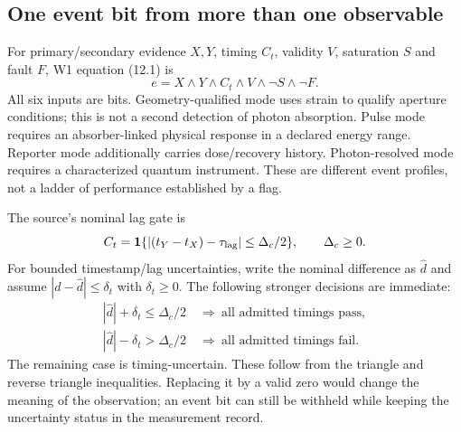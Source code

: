 \subsection{One event bit from more than one observable}
For primary/secondary evidence $X,Y$, timing $C_t$, validity $V$, saturation
$S$ and fault $F$, W1 equation (12.1) is
\begin{equation}
 e=X\land Y\land C_t\land V\land\neg S\land\neg F.
\end{equation}
All six inputs are bits. Geometry-qualified mode uses strain to qualify
aperture conditions; this is not a second detection of photon absorption.
Pulse mode requires an absorber-linked physical response in a declared
energy range. Reporter mode additionally carries dose/recovery history.
Photon-resolved mode requires a characterized quantum instrument. These are
different event profiles, not a ladder of performance established by a flag.

The source's nominal lag gate is
\begin{equation}
 C_t=\mathbf1\{|(t_Y-t_X)-\tau_{\rm lag}|\le\Delta_c/2\},
 \qquad\Delta_c\ge0.
\end{equation}
For bounded timestamp/lag uncertainties, write the nominal difference as
$\widehat d$ and assume $|d-\widehat d|\le\delta_t$ with
$\delta_t\ge0$. The following stronger decisions are immediate:
\begin{align}
 |\widehat d|+\delta_t\le\Delta_c/2&\ \Longrightarrow\ 
                \text{all admitted timings pass},\\
 |\widehat d|-\delta_t>\Delta_c/2&\ \Longrightarrow\ 
                \text{all admitted timings fail}.
\end{align}
The remaining case is timing-uncertain. These follow from the triangle and
reverse triangle inequalities. Replacing it by a valid zero would change the
meaning of the observation; an event bit can still be withheld while keeping
the uncertainty status in the measurement record.

